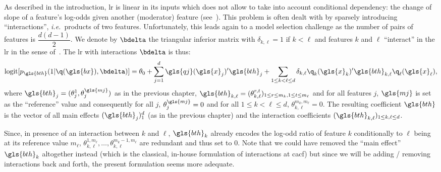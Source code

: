 As described in the introduction, \gls{lr} is linear in its inputs which does not allow to take into account conditional dependency: the change of slope of a feature's log-odds given another (moderator) feature (see~\cite{berry2010testing}). This problem is often dealt with by sparsely introducing ``interactions'', \textit{i.e.}\ products of two features. Unfortunately, this leads again to a model selection challenge as the number of pairs of features is $\dfrac{d(d-1)}{2}$. We denote by $\bdelta$ the triangular inferior matrix with $\delta_{k,\ell} = 1$ if $k < \ell$ and features $k$ and $\ell$ ``interact'' in the \gls{lr} in the sense of~\cite{berry2010testing}. The \gls{lr} with interactions $\bdelta$ is thus:
\begin{equation} \label{eq:reglog_sans}
\text{logit}[p_{\gls{bth}}(1|\q(\gls{bx}),\bdelta)] = \theta_{0} + \sum_{j=1}^d \gls{qj}(\gls{x}_j)' \gls{bth}_j + \sum_{1 \leq k < \ell \leq d} \delta_{k,\ell} \q_k(\gls{x}_k)' \gls{bth}_{k,\ell} \q_\ell(\gls{x}_\ell),
\end{equation}
where $\gls{bth}_{j} = (\theta_j^1, \theta_j^{\gls{mj}})$ as in the previous chapter, $\gls{bth}_{k,\ell} = (\theta_{k,\ell}^{r,t})_{1 \leq r \leq m_k, 1 \leq t \leq m_\ell}$ and for all features $j$, $\gls{mj}$ is set as the ``reference'' value and consequently for all $j$, $\theta_{j}^{\gls{mj}}=0$ and for all $1 \leq k < \ell \leq d$, $\theta_{k,\ell}^{m_k,m_{\ell}}=0$. The resulting coefficient $\gls{bth}$ is the vector of all main effects $(\gls{bth}_j)_1^d$ (as in the previous chapter) and the interaction coefficients $(\gls{bth}_{k,\ell})_{1 \leq k,\ell \leq d}$.

Since, in presence of an interaction between $k$ and $\ell$, $\gls{bth}_{k}$ already encodes the log-odd ratio of feature $k$ conditionally to $\ell$ being at its reference value $m_\ell$, $\theta_{k,\ell}^{1,m_\ell},\dots,\theta_{k,\ell}^{m_k-1,m_\ell}$ are redundant and thus set to $0$. Note that we could have removed the ``main effect'' $\gls{bth}_k$ altogether instead (which is the classical, in-house formulation of interactions at \gls{cacf}) but since we will be adding / removing interactions back and forth, the present formulation seems more adequate.

